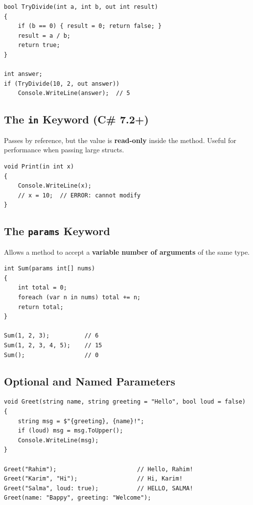 \documentclass[11pt,a4paper]{article}
\begin{document}
\begin{lstlisting}[caption={out parameter}]
bool TryDivide(int a, int b, out int result)
{
    if (b == 0) { result = 0; return false; }
    result = a / b;
    return true;
}

int answer;
if (TryDivide(10, 2, out answer))
    Console.WriteLine(answer);  // 5
\end{lstlisting}

\subsection{The \texttt{in} Keyword (C\# 7.2+)}

Passes by reference, but the value is \textbf{read-only} inside the method. Useful for performance when passing large structs.

\begin{lstlisting}[caption={in parameter}]
void Print(in int x)
{
    Console.WriteLine(x);
    // x = 10;  // ERROR: cannot modify
}
\end{lstlisting}

\subsection{The \texttt{params} Keyword}

Allows a method to accept a \textbf{variable number of arguments} of the same type.

\begin{lstlisting}[caption={params parameter}]
int Sum(params int[] nums)
{
    int total = 0;
    foreach (var n in nums) total += n;
    return total;
}

Sum(1, 2, 3);          // 6
Sum(1, 2, 3, 4, 5);    // 15
Sum();                 // 0
\end{lstlisting}

\subsection{Optional and Named Parameters}

\begin{lstlisting}[caption={Optional and named arguments}]
void Greet(string name, string greeting = "Hello", bool loud = false)
{
    string msg = $"{greeting}, {name}!";
    if (loud) msg = msg.ToUpper();
    Console.WriteLine(msg);
}

Greet("Rahim");                       // Hello, Rahim!
Greet("Karim", "Hi");                 // Hi, Karim!
Greet("Salma", loud: true);           // HELLO, SALMA!
Greet(name: "Bappy", greeting: "Welcome");
\end{lstlisting}
\end{document}
